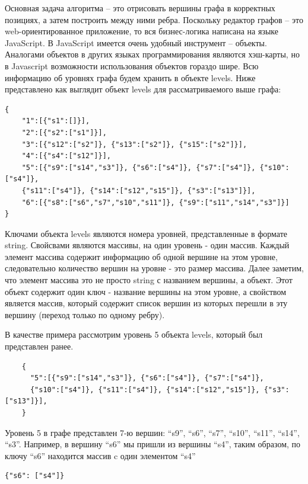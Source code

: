 Основная задача алгоритма -- это отрисовать вершины графа в корректных позициях, а затем построить между ними ребра. Поскольку редактор графов -- это web-ориентированное приложение, то вся бизнес-логика написана на языке \textsf{JavaScript}. В \textsf{JavaScript} имеется очень удобный инструмент -- объекты. Аналогами объектов в других языках программирования являются хэш-карты, но в Javascript возможности использования объектов гораздо шире. Всю информацию об уровнях графа будем хранить в объекте levels. Ниже представлено как выглядит объект levels для рассматриваемого выше графа:

\begin{verbatim}
{
	"1":[{"s1":[]}],
	"2":[{"s2":["s1"]}],
	"3":[{"s12":["s2"]}, {"s13":["s2"]}, {"s15":["s2"]}],
	"4":[{"s4":["s12"]}],
	"5":[{"s9":["s14","s3"]}, {"s6":["s4"]}, {"s7":["s4"]}, {"s10":["s4"]}, 
	{"s11":["s4"]},	{"s14":["s12","s15"]}, {"s3":["s13"]}],
	"6":[{"s8":["s6","s7","s10","s11"]}, {"s9":["s11","s14","s3"]}]
}
\end{verbatim}

Ключами объекта levels являются номера уровней, представленные в формате string. Свойсвами являются массивы, на один уровень - один массив. Каждый элемент массива содержит информацию об одной вершине на этом уровне, следовательно количество вершин на уровне - это размер массива. Далее заметим, что элемент массива это не просто string с названием вершины, а объект. Этот объект содержит один ключ - название вершины на этом уровне, а свойством является массив, который содержит список вершин из которых перешли в эту вершину (переход только по одному ребру).

В качестве примера рассмотрим уровень 5 объекта levels, который был представлен ранее.

\begin{minipage}{0.5\textwidth}
	\begin{verbatim}
	{
	  "5":[{"s9":["s14","s3"]}, {"s6":["s4"]}, {"s7":["s4"]}, 
	  {"s10":["s4"]}, {"s11":["s4"]}, {"s14":["s12","s15"]}, {"s3":["s13"]}],
	}
	\end{verbatim}
\end{minipage}


Уровень 5 в графе представлен 7-ю вершин: ``s9'', ``s6'', ``s7'', ``s10'', ``s11'', ``s14'', ``s3''. Например, в вершину ``s6'' мы пришли из вершины ``s4'', таким образом, по ключу ``s6'' находится массив c один элементом ``s4''
\begin{verbatim}
{"s6": ["s4"]}
\end{verbatim}

